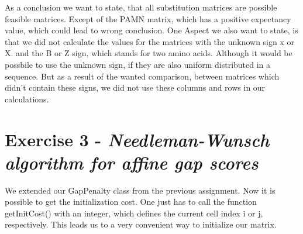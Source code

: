 \documentclass[%
   10pt,              %
   nenglish,           %
   a4paper,           %
   DIV11,             %
]{scrartcl}%
\begin{document}
 As a conclusion we want to state, that all substitution matrices are possible feasible matrices. Except of the PAMN matrix, which has a positive expectancy value, which could lead to wrong conclusion.
One Aspect we also want to state, is that we did not calculate the values for the matrices with the unknown sign x or X. and the B or Z sign,  which stands for two amino acids. Although it would be possbile to use the unknown sign, if they are also uniform distributed in a sequence. But as a result of the wanted comparison, between matrices which didn't contain these signs, we did not use these columns and rows in our calculations.
 
 \section*{Exercise 3 - \textsl{Needleman-Wunsch algorithm for affine gap scores}}

 We extended our GapPenalty class from the previous assignment. Now it is possible to get the
 initialization cost. One just has to call the function getInitCost() with an integer, which defines
 the current cell index i or j, respectively. This leads us to a very convenient way to initialize 
 our matrix. 
  
\end{document}
